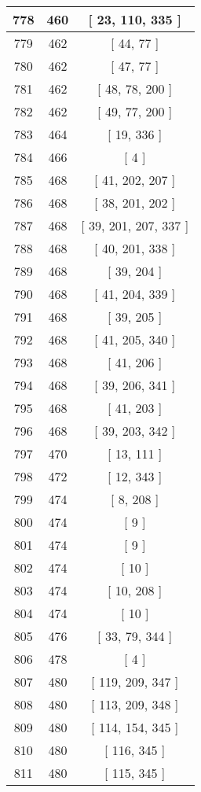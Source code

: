 \begin{center}
\begin{longtable}[H]{|| c c c ||}
\hline
778 & 460 & [ 23, 110, 335 ] \\ 
\hline
779 & 462 & [ 44, 77 ] \\ 
\hline
780 & 462 & [ 47, 77 ] \\ 
\hline
781 & 462 & [ 48, 78, 200 ] \\ 
\hline
782 & 462 & [ 49, 77, 200 ] \\ 
\hline
783 & 464 & [ 19, 336 ] \\ 
\hline
784 & 466 & [ 4 ] \\ 
\hline
785 & 468 & [ 41, 202, 207 ] \\ 
\hline
786 & 468 & [ 38, 201, 202 ] \\ 
\hline
787 & 468 & [ 39, 201, 207, 337 ] \\ 
\hline
788 & 468 & [ 40, 201, 338 ] \\ 
\hline
789 & 468 & [ 39, 204 ] \\ 
\hline
790 & 468 & [ 41, 204, 339 ] \\ 
\hline
791 & 468 & [ 39, 205 ] \\ 
\hline
792 & 468 & [ 41, 205, 340 ] \\ 
\hline
793 & 468 & [ 41, 206 ] \\ 
\hline
794 & 468 & [ 39, 206, 341 ] \\ 
\hline
795 & 468 & [ 41, 203 ] \\ 
\hline
796 & 468 & [ 39, 203, 342 ] \\ 
\hline
797 & 470 & [ 13, 111 ] \\ 
\hline
798 & 472 & [ 12, 343 ] \\ 
\hline
799 & 474 & [ 8, 208 ] \\ 
\hline
800 & 474 & [ 9 ] \\ 
\hline
801 & 474 & [ 9 ] \\ 
\hline
802 & 474 & [ 10 ] \\ 
\hline
803 & 474 & [ 10, 208 ] \\ 
\hline
804 & 474 & [ 10 ] \\ 
\hline
805 & 476 & [ 33, 79, 344 ] \\ 
\hline
806 & 478 & [ 4 ] \\ 
\hline
807 & 480 & [ 119, 209, 347 ] \\ 
\hline
808 & 480 & [ 113, 209, 348 ] \\ 
\hline
809 & 480 & [ 114, 154, 345 ] \\ 
\hline
810 & 480 & [ 116, 345 ] \\ 
\hline
811 & 480 & [ 115, 345 ] \\ 
\hline

\end{longtable}
\end{center}
